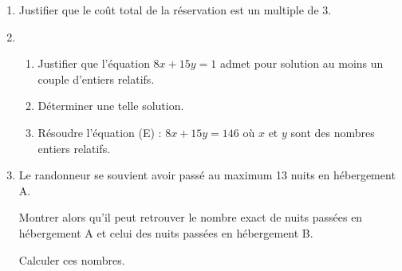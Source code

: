 \documentclass{cornouaille}
\begin{document}
\begin{exercice}[Spécialité][5]
\begin{enumerate}
\begin{enumerate}
		
	\end{enumerate}
\item Justifier que le coût total de la réservation est un multiple de 3.
\item 
	\begin{enumerate}
	\item Justifier que l'équation $8x + 15y = 1$ admet pour solution au moins un couple d'entiers relatifs.
	\item Déterminer une telle solution.
	\item Résoudre l'équation (E) : $8x + 15y = 146$ où $x$ et $y$ sont des nombres entiers relatifs.
	\end{enumerate}
\item Le randonneur se souvient avoir passé au maximum 13 nuits en hébergement A.

Montrer alors qu'il peut retrouver le nombre exact de nuits passées en hébergement A et celui des nuits passées en hébergement B.

Calculer ces nombres.
\end{enumerate}
\end{exercice}
\end{document}

